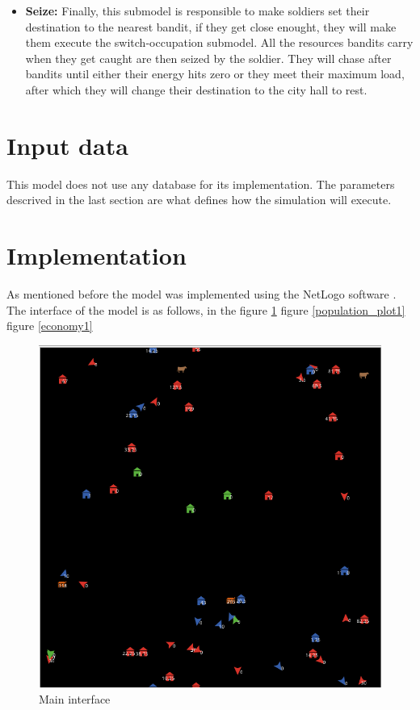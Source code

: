 \documentclass{wscpaperproc}
\begin{document}
\begin{itemize}
    \item \textbf{Seize:} Finally, this submodel is responsible to make
    soldiers set their destination to the nearest bandit, if they get close
    enought, they will make them execute the switch-occupation submodel. All
    the resources bandits carry when they get caught are then seized by the
    soldier. They will chase after bandits until either their energy hits zero
    or they meet their maximum load, after which they will change their
    destination to the city hall to rest.

\end{itemize}

\section{Input data}

This model does not use any database for its implementation. The parameters
descrived in the last section are what defines how the simulation will execute.

\section{Implementation}


As mentioned before the model was implemented using the NetLogo software
\cite{netlogo}. The interface of the model is as follows, in the
figure \ref{main_interface1}
figure \ref{population_plot1}
figure \ref{economy1}

\newpage

\begin{figure}[h!]
    \centering
    \includegraphics[scale=0.5]{Images/Interface1}
    \caption{Main interface}
    \label{main_interface1}
\end{figure}
\end{document}
